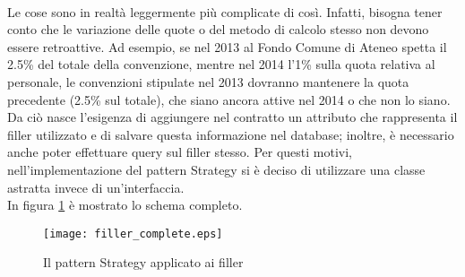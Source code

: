 \paragraph{}
Le cose sono in realtà leggermente più complicate di così. Infatti, bisogna tener conto che le variazione delle quote o del metodo di calcolo stesso non devono essere retroattive. Ad esempio, se nel 2013 al Fondo Comune di Ateneo spetta il 2.5\% del totale della convenzione, mentre nel 2014 l'1\% sulla quota relativa al personale, le convenzioni stipulate nel 2013 dovranno mantenere la quota precedente (2.5\% sul totale), che siano ancora attive nel 2014 o che non lo siano. Da ciò nasce l'esigenza di aggiungere nel contratto un attributo che rappresenta il filler utilizzato e di salvare questa informazione nel database; inoltre, è necessario anche poter effettuare query sul filler stesso. Per questi motivi, nell'implementazione del pattern Strategy si è deciso di utilizzare una classe astratta invece di un'interfaccia.\\
In figura \ref{filler_complete} è mostrato lo schema completo.

\begin{figure}
\centering
\texttt{[image: filler\_complete.eps]}
\caption{Il pattern Strategy applicato ai filler}
\label{filler_complete}
\end{figure}